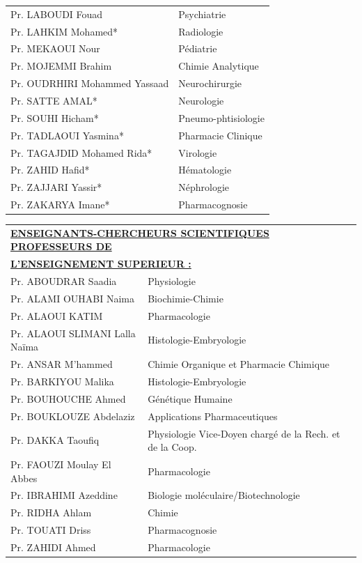 \begin{table}[H]
  \begin{tabular}{l l}
    Pr. LABOUDI Fouad & Psychiatrie \\
    Pr. LAHKIM Mohamed* & Radiologie \\
    Pr. MEKAOUI Nour & Pédiatrie \\
    Pr. MOJEMMI Brahim & Chimie Analytique \\
    Pr. OUDRHIRI Mohammed Yassaad & Neurochirurgie \\
    Pr. SATTE AMAL* & Neurologie \\
    Pr. SOUHI Hicham* & Pneumo-phtisiologie \\
    Pr. TADLAOUI Yasmina* & Pharmacie Clinique \\
    Pr. TAGAJDID Mohamed Rida* & Virologie \\
    Pr. ZAHID Hafid* & Hématologie \\
    Pr. ZAJJARI Yassir* & Néphrologie \\
    Pr. ZAKARYA Imane* & Pharmacognosie \\
  \end{tabular}
\end{table}

\begin{table}[H]
  \begin{tabular}{l l}
    \multicolumn{2}{l}{\textbf{\underline{ENSEIGNANTS-CHERCHEURS SCIENTIFIQUES PROFESSEURS DE}}}\vspace*{0.5em}\\
    \multicolumn{2}{l}{\textbf{\underline{L’ENSEIGNEMENT SUPERIEUR :}}}\vspace*{0.5em}\\
    Pr. ABOUDRAR Saadia & Physiologie \\
    Pr. ALAMI OUHABI Naima & Biochimie-Chimie \\
    Pr. ALAOUI KATIM & Pharmacologie \\
    Pr. ALAOUI SLIMANI Lalla Naïma & Histologie-Embryologie \\
    Pr. ANSAR M’hammed & Chimie Organique et Pharmacie Chimique \\
    Pr. BARKIYOU Malika & Histologie-Embryologie \\
    Pr. BOUHOUCHE Ahmed & Génétique Humaine \\
    Pr. BOUKLOUZE Abdelaziz & Applications Pharmaceutiques \\
    Pr. DAKKA Taoufiq & Physiologie Vice-Doyen chargé de la Rech. et de la Coop. \\
    Pr. FAOUZI Moulay El Abbes & Pharmacologie \\
    Pr. IBRAHIMI Azeddine & Biologie moléculaire/Biotechnologie \\
    Pr. RIDHA Ahlam & Chimie \\
    Pr. TOUATI Driss & Pharmacognosie \\
    Pr. ZAHIDI Ahmed & Pharmacologie \\
  \end{tabular}
\end{table}


